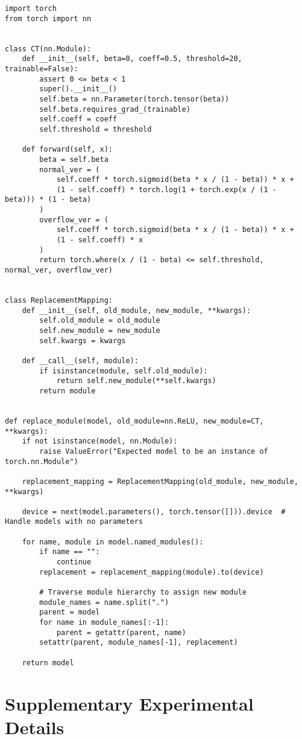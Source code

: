 \newpage
\begin{lstlisting}
import torch
from torch import nn


class CT(nn.Module):
    def __init__(self, beta=0, coeff=0.5, threshold=20, trainable=False):
        assert 0 <= beta < 1
        super().__init__()
        self.beta = nn.Parameter(torch.tensor(beta))
        self.beta.requires_grad_(trainable)
        self.coeff = coeff
        self.threshold = threshold

    def forward(self, x):
        beta = self.beta
        normal_ver = (
            self.coeff * torch.sigmoid(beta * x / (1 - beta)) * x +
            (1 - self.coeff) * torch.log(1 + torch.exp(x / (1 - beta))) * (1 - beta)
        )
        overflow_ver = (
            self.coeff * torch.sigmoid(beta * x / (1 - beta)) * x +
            (1 - self.coeff) * x
        )
        return torch.where(x / (1 - beta) <= self.threshold, normal_ver, overflow_ver)


class ReplacementMapping:
    def __init__(self, old_module, new_module, **kwargs):
        self.old_module = old_module
        self.new_module = new_module
        self.kwargs = kwargs

    def __call__(self, module):
        if isinstance(module, self.old_module):
            return self.new_module(**self.kwargs)
        return module


def replace_module(model, old_module=nn.ReLU, new_module=CT, **kwargs):
    if not isinstance(model, nn.Module):
        raise ValueError("Expected model to be an instance of torch.nn.Module")

    replacement_mapping = ReplacementMapping(old_module, new_module, **kwargs)

    device = next(model.parameters(), torch.tensor([])).device  # Handle models with no parameters

    for name, module in model.named_modules():
        if name == "":
            continue
        replacement = replacement_mapping(module).to(device)

        # Traverse module hierarchy to assign new module
        module_names = name.split(".")
        parent = model
        for name in module_names[:-1]:
            parent = getattr(parent, name)
        setattr(parent, module_names[-1], replacement)

    return model
\end{lstlisting}
\newpage


\section{Supplementary Experimental Details}\label{app:exp}
